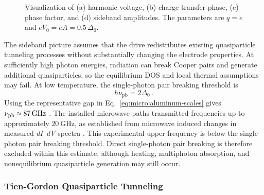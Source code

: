         \begin{figure}[t]
            \centering
            \hfill
            \hfill
            \hfill
            \caption{
                Visualization of (a) harmonic voltage, (b) charge transfer phase, (c) phase factor, and (d) sideband amplitudes. The parameters are $q=e$ and $eV_0=eA=0.5\,\Delta_0$.
            }
            \label{fig:micro:pat-drive}
        \end{figure}

        The sideband picture assumes that the drive redistributes existing quasiparticle tunneling processes without substantially changing the electrode properties. At sufficiently high photon energies, radiation can break Cooper pairs and generate additional quasiparticles, so the equilibrium DOS and local thermal assumptions may fail. At low temperature, the single-photon pair breaking threshold is
        \begin{equation}
            h\nu_\mathrm{pb} = 2\Delta_0\,.
        \end{equation}
        Using the representative gap in Eq.~\eqref{eq:micro:aluminum-scales} gives $\nu_\mathrm{pb}\sapprox\qty{87}{\giga\hertz}$ \cite{bardeen_theory_1957,tinkham_introduction_2004}. The installed microwave paths transmitted frequencies up to approximately $\qty{20}{\giga\hertz}$, as established from microwave induced changes in measured \textit{dI--dV} spectra \cite{raif_electronic_2024}. This experimental upper frequency is below the single-photon pair breaking threshold. Direct single-photon pair breaking is therefore excluded within this estimate, although heating, multiphoton absorption, and nonequilibrium quasiparticle generation may still occur.

        \subsubsection*{Tien-Gordon Quasiparticle Tunneling}

